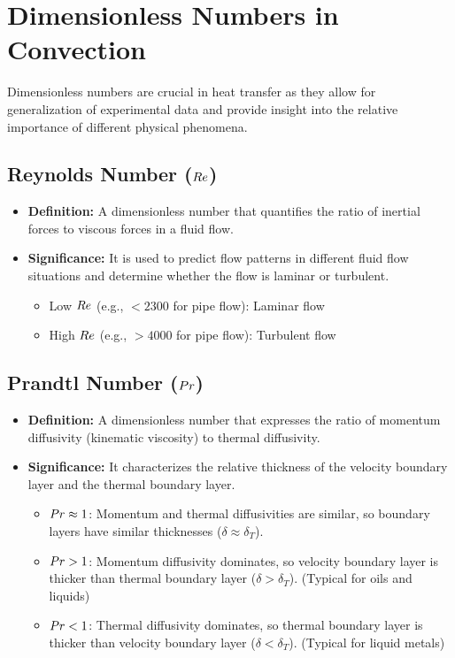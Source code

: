 \section{Dimensionless Numbers in Convection}
Dimensionless numbers are crucial in heat transfer as they allow for generalization of experimental data and provide insight into the relative importance of different physical phenomena.

\subsection{Reynolds Number ($Re$)}
\begin{itemize}
    \item \textbf{Definition:} A dimensionless number that quantifies the ratio of inertial forces to viscous forces in a fluid flow.
    \item \textbf{Significance:} It is used to predict flow patterns in different fluid flow situations and determine whether the flow is laminar or turbulent.
        \begin{itemize}
            \item Low $Re$ (e.g., $< 2300$ for pipe flow): Laminar flow
            \item High $Re$ (e.g., $> 4000$ for pipe flow): Turbulent flow
        \end{itemize}
\end{itemize}

\subsection{Prandtl Number ($Pr$)}
\begin{itemize}
    \item \textbf{Definition:} A dimensionless number that expresses the ratio of momentum diffusivity (kinematic viscosity) to thermal diffusivity.
    \item \textbf{Significance:} It characterizes the relative thickness of the velocity boundary layer and the thermal boundary layer.
        \begin{itemize}
            \item $Pr \approx 1$: Momentum and thermal diffusivities are similar, so boundary layers have similar thicknesses ($\delta \approx \delta_T$).
            \item $Pr > 1$: Momentum diffusivity dominates, so velocity boundary layer is thicker than thermal boundary layer ($\delta > \delta_T$). (Typical for oils and liquids)
            \item $Pr < 1$: Thermal diffusivity dominates, so thermal boundary layer is thicker than velocity boundary layer ($\delta < \delta_T$). (Typical for liquid metals)
        \end{itemize}
\end{itemize}

